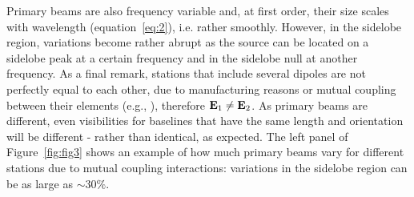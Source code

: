 \begin{itemize}
Primary beams are also frequency variable and, at first order, their size scales with wavelength (equation~\ref{eq:2}), i.e. rather smoothly. However, in the sidelobe region, variations become rather abrupt as the source can be located on a sidelobe peak at a certain frequency and in the sidelobe null at another frequency. As a final remark, stations that include several dipoles are not perfectly equal to each other, due to manufacturing reasons or mutual coupling between their elements (e.g., \cite{sokolowski17}), therefore ${\bf E}_1 \neq {\bf E}_2$. As primary beams are different, even visibilities for baselines that have the same length and orientation will be different - rather than identical, as expected. The left panel of Figure~\ref{fig:fig3} shows an example of how much primary beams vary for different stations due to mutual coupling interactions: variations in the sidelobe region can be as large as $\sim 30\%$.


\end{itemize}
